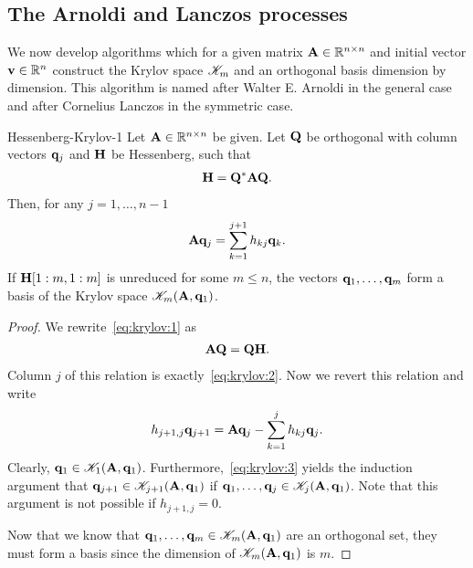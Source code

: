 \subsection{The Arnoldi and Lanczos processes}

\begin{intro}
  We now develop algorithms which for a given matrix $\mathbf A\in\mathbb R^{n\times n}$
  and initial vector $\mathbf v\in\mathbb R^n$ construct the Krylov space
  $\mathscr K_m$ and an orthogonal basis dimension by dimension. This
  algorithm is named after Walter E. Arnoldi in the general case and
  after Cornelius Lanczos in the symmetric case.
\end{intro}

\begin{Lemma}{Hessenberg-Krylov-1}
  Let $\mathbf A\in\mathbb R^{n\times n}$ be given. Let $\mathbf Q$ be orthogonal with column
  vectors $\mathbf q_j$ and $\mathbf H$ be Hessenberg, such that
  \begin{gather}
    \label{eq:krylov:1}
    \mathbf H = \mathbf Q^*\mathbf A\mathbf Q.
  \end{gather}
  Then, for any $j=1,\dots,n-1$
  \begin{gather}
    \label{eq:krylov:2}
    \mathbf A\mathbf q_j = \sum_{k=1}^{j+1} h_{kj}\mathbf q_k.
  \end{gather}
  If $\mathbf H[1:m,1:m]$ is unreduced for some $m\le n$, the vectors
  $\mathbf q_1,\dots,\mathbf q_m$ form a basis of the Krylov space
  $\mathscr K_{m}(\mathbf A,\mathbf q_1)$.
\end{Lemma}

\begin{proof}
  We rewrite~\eqref{eq:krylov:1} as
  \begin{gather}
    \mathbf A\mathbf Q = \mathbf Q\mathbf H.
  \end{gather}
  Column $j$ of this relation is exactly~\eqref{eq:krylov:2}. Now we
  revert this relation and write
  \begin{gather}
    \label{eq:krylov:3}
    h_{j+1,j} \mathbf q_{j+1} = \mathbf A\mathbf q_j - \sum_{k=1}^j h_{kj} \mathbf q_j.
  \end{gather}
  Clearly, $\mathbf q_1\in\mathscr K_1(\mathbf A,\mathbf q_1)$.
  Furthermore,~\eqref{eq:krylov:3} yields the induction argument that
  $\mathbf q_{j+1}\in \mathscr K_{j+1}(\mathbf A,\mathbf q_1)$ if
  $\mathbf q_1,\dots,\mathbf q_j\in \mathscr K_j(\mathbf A,\mathbf q_1)$. Note that this
  argument is not possible if $h_{j+1,j}=0$.

  Now that we know that $\mathbf q_1,\dots,\mathbf q_m\in\mathscr K_{m}(\mathbf A,\mathbf q_1)$
  are an orthogonal set, they must form a basis since the dimension of
  $\mathscr K_{m}(\mathbf A,\mathbf q_1)$ is $m$.
\end{proof}

